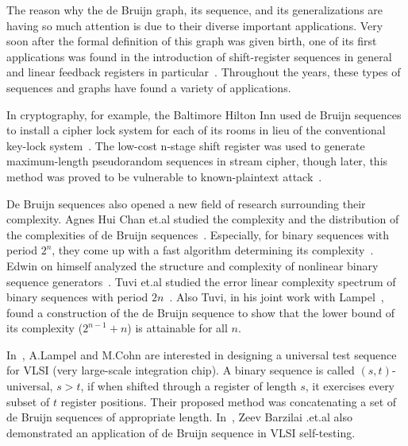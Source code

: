 The reason why the de Bruijn graph, its sequence, and its generalizations are having so much attention is due to their diverse important applications. Very soon after the formal definition of this graph was given birth, one of its first applications was found in the introduction of shift-register sequences in general and linear feedback registers in particular~\cite{golomb19821967}. Throughout the years, these types of sequences and graphs have found a variety of applications.

In cryptography, for example, the Baltimore Hilton Inn used de Bruijn sequences to install a cipher lock system for each of its rooms in lieu of the conventional key-lock system~\cite{fredricksen1982survey}. The low-cost n-stage shift register was used to generate maximum-length pseudorandom sequences in stream cipher, though later, this method was proved to be vulnerable to known-plaintext attack~\cite{lempel1979cryptology}.

De Bruijn sequences also opened a new field of research surrounding their complexity. Agnes Hui Chan et.al studied the complexity and the distribution of the complexities of de Bruijn sequences~\cite{chan1982complexities}. Especially, for binary sequences with period $2^n$, they come up with a fast algorithm determining its complexity~\cite{games1983fast}. Edwin on himself analyzed the structure and complexity of nonlinear binary sequence generators~\cite{key1976analysis}. Tuvi et.al studied the error linear complexity spectrum of binary sequences with period $2n$~\cite{etzion2009properties}. Also Tuvi, in his joint work with Lampel~\cite{etzion1984construction}, found a construction of the de Bruijn sequence to show that the lower bound of its complexity ($2^{n-1}+n$) is attainable for all $n$.

In~\cite{lempel1985design}, A.Lampel and M.Cohn are interested in designing a universal test sequence for VLSI (very large-scale integration chip). A binary sequence is called $(s,t)$-universal, $s>t$, if when shifted through a register of length $s$, it exercises every subset of $t$ register positions. Their proposed method was concatenating a set of de Bruijn sequences of appropriate length. In~\cite{barzilai1983exhaustive}, Zeev Barzilai .et.al also demonstrated an application of de Bruijn sequence in VLSI self-testing.

